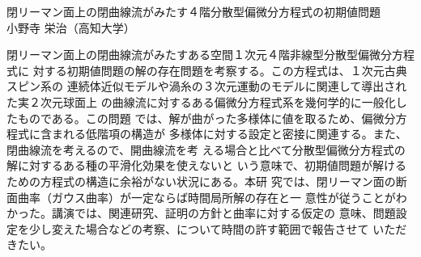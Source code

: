 \documentclass[a4paper,reqno,12pt]{article}
\theoremstyle{plain}
\theoremstyle{definition}
\theoremstyle{remark}
\begin{document}
\begin{center}
\begin{Large}
閉リーマン面上の閉曲線流がみたす４階分散型偏微分方程式の初期値問題
\vspace{12pt}
\\
小野寺 栄治（高知大学）
\end{Large}
\end{center}
%
%
\par
%
%
閉リーマン面上の閉曲線流がみたすある空間１次元４階非線型分散型偏微分方程式に
対する初期値問題の解の存在問題を考察する。この方程式は、１次元古典スピン系の
連続体近似モデルや渦糸の３次元運動のモデルに関連して導出された実２次元球面上
の曲線流に対するある偏微分方程式系を幾何学的に一般化したものである。この問題
では、解が曲がった多様体に値を取るため、偏微分方程式に含まれる低階項の構造が
多様体に対する設定と密接に関連する。また、閉曲線流を考えるので、開曲線流を考
える場合と比べて分散型偏微分方程式の解に対するある種の平滑化効果を使えないと
いう意味で、初期値問題が解けるための方程式の構造に余裕がない状況にある。本研
究では、閉リーマン面の断面曲率（ガウス曲率）が一定ならば時間局所解の存在と一
意性が従うことがわかった。講演では、関連研究、証明の方針と曲率に対する仮定の
意味、問題設定を少し変えた場合などの考察、について時間の許す範囲で報告させて
いただきたい。
%
%
\end{document}
